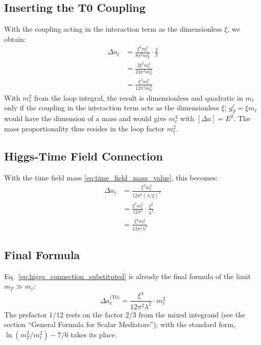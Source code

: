 	\subsection{Inserting the T0 Coupling}
	
	With the coupling acting in the interaction term as the dimensionless $\xi$, we obtain:
	\begin{equation}
		\begin{split}
			\Delta a_\ell &= \frac{\xi^2 m_\ell^2}{8\pi^2 m_T^2} \cdot \frac{2}{3} \\
			&= \frac{2 \xi^2 m_\ell^2}{24\pi^2 m_T^2} \\
			&= \frac{\xi^2 m_\ell^2}{12\pi^2 m_T^2}
		\end{split}
		\label{eq:t0_coupling_inserted}
	\end{equation}
	With $m_\ell^2$ from the loop integral, the result is dimensionless and quadratic in $m_\ell$ only if the coupling in the interaction term acts as the dimensionless $\xi$; $g_T^\ell = \xi m_\ell$ would have the dimension of a mass and would give $m_\ell^4$ with $[\Delta a] = E^2$. The mass proportionality thus resides in the loop factor $m_\ell^2$.
	
	\subsection{Higgs-Time Field Connection}
	
	With the time field mass \eqref{eq:time_field_mass_value}, this becomes:
	\begin{equation}
		\begin{split}
			\Delta a_\ell &= \frac{\xi^2 m_\ell^2}{12\pi^2 (\lambda/\xi)^2} \\
			&= \frac{\xi^2 m_\ell^2}{12\pi^2} \cdot \frac{\xi^2}{\lambda^2} \\
			&= \frac{\xi^4 m_\ell^2}{12\pi^2 \lambda^2}
		\end{split}
		\label{eq:higgs_connection_substituted}
	\end{equation}
	
	\subsection{Final Formula}

	Eq.~\eqref{eq:higgs_connection_substituted} is already the final formula of the limit $m_T \gg m_\ell$:
	\begin{equation}
		\boxed{\Delta a_\ell^{\text{(T0)}} = \frac{\xi^4}{12\pi^2\lambda^2} \cdot m_\ell^2}
		\label{eq:t0_fundamental_formula}
	\end{equation}
	The prefactor $1/12$ rests on the factor $2/3$ from the mixed integrand (see the section \enquote{General Formula for Scalar Mediators}); with the standard form, $\ln(m_T^2/m_\ell^2) - 7/6$ takes its place.

